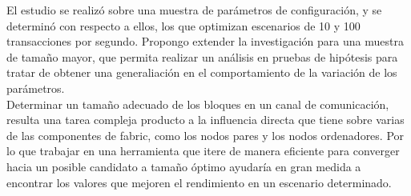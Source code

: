 \begin{recomendations}
El estudio se realiz\'o sobre una muestra de par\'ametros de configuraci\'on, y se determin\'o con respecto a ellos, los que optimizan escenarios de 10 y 100 transacciones por segundo. Propongo extender la investigaci\'on para una muestra de tama\~no mayor, que permita realizar un an\'alisis en pruebas de hip\'otesis para tratar de obtener una generaliaci\'on en el comportamiento de la variaci\'on de los par\'ametros.\\

Determinar un tama\~no adecuado de los bloques en un canal de comunicaci\'on, resulta una tarea compleja producto a la influencia directa que tiene sobre varias de las componentes de fabric, como los nodos pares y los nodos ordenadores. Por lo que trabajar en una herramienta que itere de manera eficiente para converger hacia un posible candidato a tama\~no \'optimo ayudar\'ia en gran medida a encontrar los valores que mejoren el rendimiento en un escenario determinado.
\end{recomendations}
